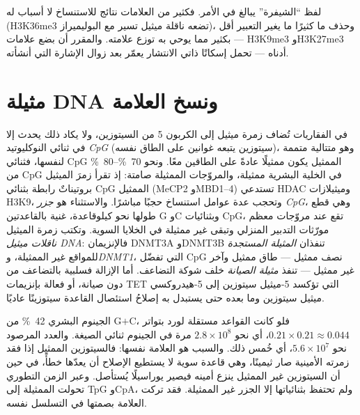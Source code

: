\begin{remark}\label{rem:b3:chromatin-epigenetics:code}
لفظ ``الشيفرة'' يبالغ في الأمر. فكثير من العلامات نتائج للاستنساخ لا
أسباب له (H3K36me3 تضعه ناقلة ميثيل تسير مع البوليميراز)، وحذف 
ما كثيرًا ما يغير التعبير أقل بكثير مما يوحي به توزع علامته. والمقرر
أن بضع علامات --- H3K9me3 وH3K27me3  أدناه --- تحمل إسكاتًا
ذاتي الانتشار يعمّر بعد زوال الإشارة التي أنشأته.
\end{remark}

\section{مثيلة DNA ونسخ العلامة}

\begin{definition}\label{def:b3:chromatin-epigenetics:methylation}
في الفقاريات تُضاف زمرة ميثيل إلى الكربون 5 من السيتوزين، ولا يكاد
ذلك يحدث إلا في ثنائي النوكليوتيد \emph{CpG} (سيتوزين يتبعه غوانين
على الطاق نفسه)، وهو متتالية متممة لنفسها، فثنائي CpG الممثيل يكون ممثيلًا
عادةً على الطاقين معًا. ونحو \qtyrange{70}{80}{\%} من CpG في الخلية
البشرية ممثيلة، والمروّجات الممثيلة صامتة: إذ تقرأ زمرَ الميثيل
بروتيناتٌ رابطة بثنائي CpG الممثيل (MeCP2 وMBD1--4) تستدعي HDAC وميثيلازات
H3K9، وتحجب عدة عوامل استنساخ حجبًا مباشرًا. والاستثناء هو
\emph{جزر CpG}، وهي قطع طولها نحو كيلوقاعدة، غنية بالقاعدتين G وC وبثنائيات CpG،
تقع عند مروّجات معظم مورّثات التدبير المنزلي وتبقى غير ممثيلة في
الخلايا السوية. وتكتب زمرة الميثيل \emph{ناقلات ميثيل DNA}: فالإنزيمان DNMT3A وDNMT3B تنفذان \emph{المثيلة المستجدة} للمواقع غير
الممثيلة، و\emph{DNMT1}، التي تفضّل CpG نصف ممثيل --- طاق ممثيل وآخر غير
ممثيل --- تنفذ \emph{مثيلة الصيانة} خلف شوكة التضاعف. أما الإزالة
فسلبية بالتضاعف من دون صيانة، أو فعالة بإنزيمات TET التي تؤكسد
5-ميثيل سيتوزين إلى 5-هيدروكسي ميثيل سيتوزين وما بعده حتى يستبدل به
إصلاحُ استئصال القاعدة سيتوزينًا عاديًا.
\end{definition}

\begin{example}\label{ex:b3:chromatin-epigenetics:cpg-deficit}
الجينوم البشري \qty{42}{\%} من G$+$C، فلو كانت القواعد مستقلة لورد
 بتواتر $0.21\times 0.21 \approx 0.044$، أي نحو
$2.8\times 10^{8}$ مرة في الجينوم ثنائي الصيغة. والعدد المرصود نحو
$5.6\times 10^{7}$، أي خُمس ذلك. والسبب هو العلامة نفسها: فالسيتوزين
الممثيل إذا فقد زمرته الأمينية صار ثيمينًا، وهي قاعدة سوية لا يستطيع
الإصلاح أن يعدّها خطأً، في حين أن السيتوزين غير الممثيل ينزع أمينه
فيصير يوراسيلًا يُستأصل. وعبر الزمن التطوري تحولت  الممثيلة إلى
TpG وCpA، ولم تحتفظ بثنائياتها إلا الجزر غير الممثيلة. فقد تركت العلامة
بصمتها في التسلسل نفسه.
\end{example}

